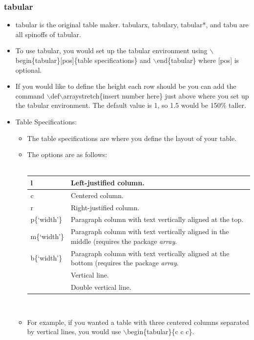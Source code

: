 \documentclass{article}
\begin{document}
			\subsubsection{tabular}
				\begin{itemize}
					\item tabular is the original table maker. tabularx, tabulary, tabular*, and tabu are all spinoffs of tabular.
					\item To use tabular, you would set up the tabular environment using $\backslash$begin\{tabular\}[pos]\{table specifications\} and $\backslash$end\{tabular\} where [pos] is optional.
					\item If you would like to define the height each row should be you can add the command $\backslash$def$\backslash$arraystretch\{insert number here\} just above where you set up the tabular environment. The default value is 1, so 1.5 would be 150\% taller.
					\item Table Specifications:
					\begin{itemize}
						\item The table specifications are where you define the layout of your table.
						\item The options are as follows:\\\\
						\def\arraystretch{1.4}
						\begin{tabularx}{\textwidth}{| l | X |}
							\hline
							l & Left-justified column.\\
							\hline
							c & Centered column.\\
							\hline
							r & Right-justified column.\\
							\hline
							p\{\lq{}width\rq{}\} & Paragraph column with text vertically aligned at the top.\\
							\hline
							m\{\lq{}width\rq{}\} & Paragraph column with text vertically aligned in the middle (requires the package \textit{array}.\\
							\hline
							b\{\lq{}width\rq{}\} & Paragraph column with text vertically aligned at the bottom (requires the package \textit{array}.\\
							\hline
							\textbar & Vertical line.\\
							\hline
							\textbar\textbar & Double vertical line.\\
							\hline
						\end{tabularx}\\
						\item For example, if you wanted a table with three centered columns separated by vertical lines, you would use $\backslash$begin\{tabular\}\{c \textbar{} c \textbar{} c\}.

\end{itemize}
\end{itemize}
\end{document}
